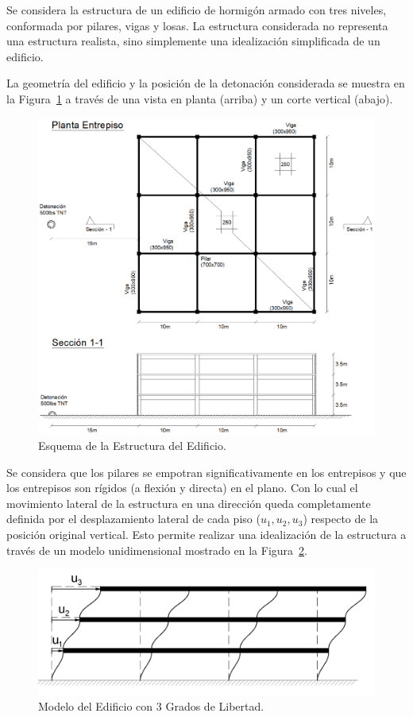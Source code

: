 Se considera la estructura de un edificio de hormigón armado con tres niveles, conformada por pilares, vigas y losas. %
%
La estructura considerada no representa una estructura realista, sino simplemente una idealización simplificada de un edificio. %

La geometría del edificio y la posición de la detonación considerada se muestra en la Figura~\ref{fig:Edificio} a través de una vista en planta (arriba) y un corte vertical (abajo).

\begin{figure}[htb]
	\centering
	\includegraphics[width=.9\linewidth]{../fig/edificio}
	\caption{Esquema de la Estructura del Edificio.}
	\label{fig:Edificio}
\end{figure}


Se considera que los pilares se empotran significativamente en los entrepisos y que los entrepisos son rígidos (a flexión y directa) en el plano. %
%
Con lo cual el movimiento lateral de la estructura en una dirección queda completamente definida por el desplazamiento lateral de cada piso ($u_1,u_2,u_3$) respecto de la posición original vertical. %
%
Esto permite realizar una idealización de la estructura a través de un modelo unidimensional mostrado en la Figura~\ref{fig:3dof}.

\begin{figure}[htb]
	\centering
	\includegraphics[width=.6\linewidth]{../fig/model3dof}
	\caption{Modelo del Edificio con 3 Grados de Libertad.}
	\label{fig:3dof}
\end{figure}

